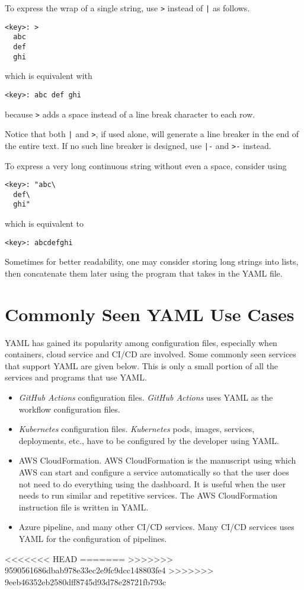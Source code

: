 To express the wrap of a single string, use \verb|>| instead of \texttt{|} as follows.
\begin{lstlisting}
<key>: >
  abc
  def
  ghi
\end{lstlisting}
which is equivalent with
\begin{lstlisting}
<key>: abc def ghi
\end{lstlisting}
because \verb|>| adds a space instead of a line break character to each row.

Notice that both \texttt{|} and \verb|>|, if used alone, will generate a line breaker in the end of the entire text. If no such line breaker is designed, use \texttt{|-} and \verb|>-| instead.

To express a very long continuous string without even a space, consider using
\begin{lstlisting}
<key>: "abc\
  def\
  ghi"
\end{lstlisting}
which is equivalent to
\begin{lstlisting}
<key>: abcdefghi
\end{lstlisting}
Sometimes for better readability, one may consider storing long strings into lists, then concatenate them later using the program that takes in the YAML file.

\section{Commonly Seen YAML Use Cases}

YAML has gained its popularity among configuration files, especially when containers, cloud service and CI/CD are involved. Some commonly seen services that support YAML are given below. This is only a small portion of all the services and programs that use YAML.

\begin{itemize}
	\item \textit{GitHub Actions} configuration files. \textit{GitHub Actions} uses YAML as the workflow configuration files.
	\item \textit{Kubernetes} configuration files. \textit{Kubernetes} pods, images, services, deployments, etc., have to be configured by the developer using YAML.
	\item AWS CloudFormation. AWS CloudFormation is the manuscript using which AWS can start and configure a service automatically so that the user does not need to do everything using the dashboard. It is useful when the user needs to run similar and repetitive services. The AWS CloudFormation instruction file is written in YAML.
	\item Azure pipeline, and many other CI/CD services. Many CI/CD services uses YAML for the configuration of pipelines.
\end{itemize}
<<<<<<< HEAD
=======
>>>>>>> 9590561686dbab978e33ec2e9fc9dcc148803fe4
>>>>>>> 9eeb46352eb2580dff8745d93d78e28721fb793c
